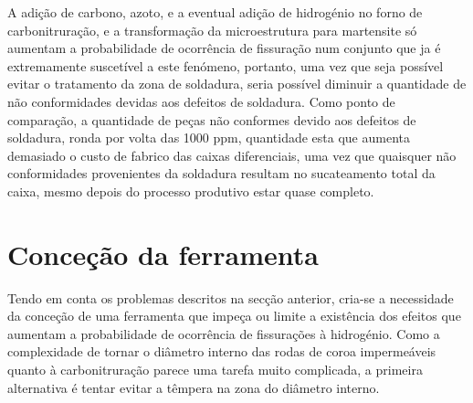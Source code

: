 \par
A adição de carbono, azoto, e a eventual adição de hidrogénio no forno de carbonitruração, e a transformação da microestrutura para martensite só aumentam a probabilidade de ocorrência de fissuração num conjunto que ja é extremamente suscetível a este fenómeno, portanto, uma vez que seja possível evitar o tratamento da zona de soldadura, seria possível diminuir a quantidade de não conformidades devidas aos defeitos de soldadura. Como ponto de comparação, a quantidade de peças não conformes devido aos defeitos de soldadura, ronda por volta das 1000 ppm, quantidade esta que aumenta demasiado o custo de fabrico das caixas diferenciais, uma vez que quaisquer não conformidades provenientes da soldadura resultam no sucateamento total da caixa, mesmo depois do processo produtivo estar quase completo.
\section{Conceção da ferramenta} \label{sec:materiais_concecao}
Tendo em conta os problemas descritos na secção anterior, cria-se a necessidade da conceção de uma ferramenta que impeça ou limite a existência dos efeitos que aumentam a probabilidade de ocorrência de fissurações à hidrogénio. Como a complexidade de tornar o diâmetro interno das rodas de coroa impermeáveis quanto à carbonitruração parece uma tarefa muito complicada, a primeira alternativa é tentar evitar a têmpera na zona do diâmetro interno.
